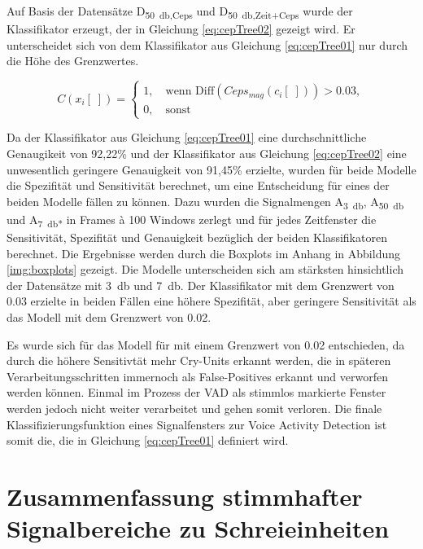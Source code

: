 Auf Basis der Datensätze D\textsubscript{\SI{50}{\decibel},Ceps} und D\textsubscript{\SI{50}{\decibel},Zeit+Ceps} wurde der Klassifikator erzeugt, der in Gleichung \ref{eq:cepTree02} gezeigt wird. Er unterscheidet sich von dem Klassifikator aus Gleichung \ref{eq:cepTree01} nur durch die Höhe des Grenzwertes.

\begin{equation}
C(x_i[\;]) = \begin{cases}
1, \quad \text{wenn  Diff}(Ceps_{mag}(c_i[\;])) > 0.03, \\
0, \quad \text{sonst}
\end{cases}
\label{eq:cepTree02}
\end{equation}

Da der Klassifikator aus Gleichung \ref{eq:cepTree01} eine durchschnittliche Genaugikeit von 92,22\% und der Klassifikator aus Gleichung \ref{eq:cepTree02} eine unwesentlich geringere Genauigkeit von 91,45\% erzielte, wurden für beide Modelle die Spezifität und Sensitivität berechnet, um eine Entscheidung für eines der beiden Modelle fällen zu können. Dazu wurden die Signalmengen A\textsubscript{\SI{3}{\decibel}}, A\textsubscript{\SI{50}{\decibel}} und A\textsubscript{\SI{7}{\decibel}*} in Frames \`{a} 100 Windows zerlegt und für jedes Zeitfenster die Sensitivität, Spezifität und Genauigkeit bezüglich der beiden Klassifikatoren berechnet. Die Ergebnisse werden durch die Boxplots im Anhang in Abbildung \ref{img:boxplots} gezeigt. Die Modelle unterscheiden sich am stärksten hinsichtlich der Datensätze mit \SI{3}{\decibel} und \SI{7}{\decibel}. Der Klassifikator mit dem Grenzwert von 0.03 erzielte in beiden Fällen eine höhere Spezifität, aber geringere Sensitivität als das Modell mit dem Grenzwert von 0.02. 

Es wurde sich für das Modell für mit einem Grenzwert von 0.02 entschieden, da durch die höhere Sensitivtät mehr Cry-Units erkannt werden, die in späteren Verarbeitungsschritten immernoch als False-Positives erkannt und verworfen werden können. Einmal im Prozess der VAD als stimmlos markierte Fenster werden jedoch nicht weiter verarbeitet und gehen somit \glqq verloren\grqq. Die finale Klassifizierungsfunktion eines Signalfensters zur Voice Activity Detection ist somit die, die in Gleichung \ref{eq:cepTree01} definiert wird.

\section{Zusammenfassung stimmhafter Signalbereiche zu Schreieinheiten}
\label{sec:marking_cry-units_new}

